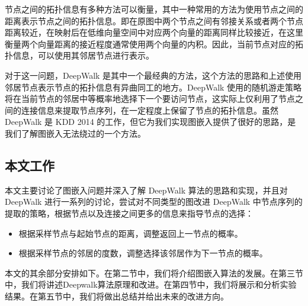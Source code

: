 \documentclass{ctexart}
\begin{document}
节点之间的拓扑信息有多种方法可以衡量，其中一种常用的方法为使用节点之间的距离表示节点之间的拓扑信息。即在原图中两个节点之间有邻接关系或者两个节点距离较近，在映射后在低维向量空间中对应两个向量的距离同样比较接近，在这里衡量两个向量距离的接近程度通常使用两个向量的内积。因此，当前节点对应的拓扑信息，可以使用其邻居节点进行表示。


对于这一问题，DeepWalk 是其中一个最经典的方法，这个方法的思路和上述使用邻居节点表示节点的拓扑信息有异曲同工的地方。DeepWalk 使用的随机游走策略将在当前节点的邻居中等概率地选择下一个要访问节点，这实际上仅利用了节点之间的连接信息来提取节点序列，在一定程度上保留了节点的拓扑信息。虽然 DeepWalk 是 KDD 2014 的工作，但它为我们实现图嵌入提供了很好的思路，是我们了解图嵌入无法绕过的一个方法。

\subsection{本文工作}

本文主要讨论了图嵌入问题并深入了解 DeepWalk 算法的思路和实现，并且对 DeepWalk 进行一系列的讨论，尝试对不同类型的图改进 DeepWalk 中节点序列的提取的策略，根据节点以及连接之间更多的信息来指导节点的选择：

\begin{itemize}
    \item 根据采样节点与起始节点的距离，调整返回上一节点的概率。
    \item 根据采样节点的邻居的度数，调整选择该邻居作为下一节点的概率。
\end{itemize}

本文的其余部分安排如下。在第二节中，我们将介绍图嵌入算法的发展。在第三节中，我们将讲述Deepwalk算法原理和改进。在第四节中，我们将展示和分析实验结果。在第五节中，我们将做出总结并给出未来的改进方向。
\end{document}
